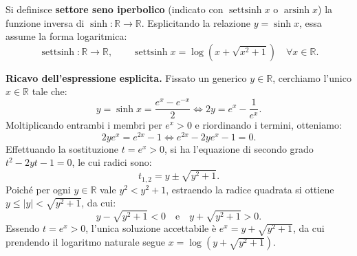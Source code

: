 \begin{defbox}
Si definisce \textbf{settore seno iperbolico} (indicato con $\operatorname{settsinh} x$ o $\operatorname{arsinh} x$) la funzione inversa di $\sinh \colon \mathbb{R} \to \mathbb{R}$. Esplicitando la relazione $y = \sinh x$, essa assume la forma logaritmica:
\[
    \operatorname{settsinh} \colon \mathbb{R} \to \mathbb{R}, \qquad \operatorname{settsinh} x = \log\!\left(x + \sqrt{x^2 + 1}\right) \quad \forall x \in \mathbb{R}.
\]
\end{defbox}

\noindent\textbf{Ricavo dell'espressione esplicita.} Fissato un generico $y \in \mathbb{R}$, cerchiamo l'unico $x \in \mathbb{R}$ tale che:
\[
    y = \sinh x = \frac{e^x - e^{-x}}{2} \iff 2y = e^x - \frac{1}{e^x}.
\]
Moltiplicando entrambi i membri per $e^x > 0$ e riordinando i termini, otteniamo:
\[
    2y e^x = e^{2x} - 1 \iff e^{2x} - 2y e^x - 1 = 0.
\]
Effettuando la sostituzione $t = e^x > 0$, si ha l'equazione di secondo grado $t^2 - 2yt - 1 = 0$, le cui radici sono:
\[
    t_{1,2} = y \pm \sqrt{y^2 + 1}.
\]
Poiché per ogni $y \in \mathbb{R}$ vale $y^2 < y^2 + 1$, estraendo la radice quadrata si ottiene $y \le |y| < \sqrt{y^2 + 1}$, da cui:
\[
    y - \sqrt{y^2 + 1} < 0 \quad \text{e} \quad y + \sqrt{y^2 + 1} > 0.
\]
Essendo $t = e^x > 0$, l'unica soluzione accettabile è $e^x = y + \sqrt{y^2 + 1}$, da cui prendendo il logaritmo naturale segue $x = \log\!\left(y + \sqrt{y^2 + 1}\right)$.

\begin{center}
\end{center}

